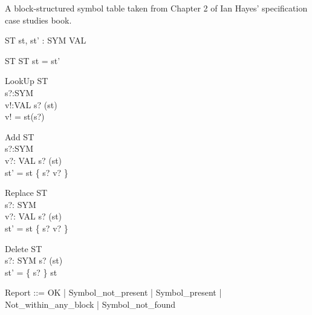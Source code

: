 A block-structured symbol table taken from Chapter 2
of Ian Hayes' specification case studies book.

\begin{zed}
\end{zed}

\begin{schema}{\Delta ST}
 st, st' : SYM \pfun VAL \\
\end{schema}

\begin{schema}{\Xi ST}
  \Delta ST
\where
  st = st'
\end{schema}

\begin{schema}{LookUp}
  \Xi ST \\
  s?:SYM \\
  v!:VAL
\where
  s? \in \dom(st) \\
  v! = st(s?)
\end{schema}

\begin{schema}{Add}
  \Delta ST \\
  s?:SYM \\
  v?: VAL
\where
  s? \notin \dom(st) \\
  st' = st \cup \{ s? \mapsto v? \}
\end{schema}

\begin{schema}{Replace}
  \Delta ST \\
  s?: SYM \\
  v?: VAL
\where
  s? \in \dom(st) \\
  st' = st \oplus \{ s? \mapsto v? \}
\end{schema}

\begin{schema}{Delete}
  \Delta ST \\
  s?: SYM
\where
  s? \in \dom(st) \\
  st' = \{ s? \} \ndres st
\end{schema}


\begin{zed}
  Report ::= OK
                  | Symbol\_not\_present
		  | Symbol\_present
		  | Not\_within\_any\_block
		  | Symbol\_not\_found
\end{zed}

